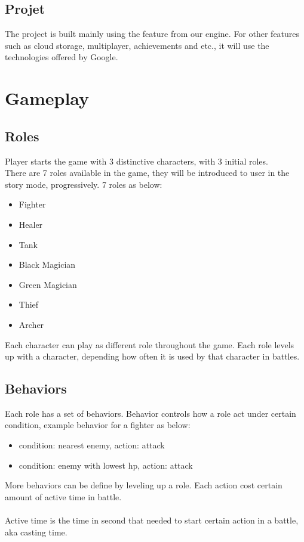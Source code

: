 \documentclass[16pt, oneside]{report}
\begin{document}
\section{Projet}
The project is built mainly using the feature from our engine. For other features such as cloud storage, multiplayer, achievements and etc., it will use the technologies offered by Google.

\chapter{Gameplay}
\section{Roles}
Player starts the game with 3 distinctive characters, with 3 initial roles. \\
There are 7 roles available in the game, they will be introduced to user in the story mode, progressively. 7 roles as below:
\begin{itemize}
	\item Fighter
	\item Healer
	\item Tank
	\item Black Magician
	\item Green Magician
	\item Thief
	\item Archer\\
\end{itemize}
Each character can play as different role throughout the game. Each role levels up with a character, depending how often it is used by that character in battles.

\section{Behaviors}
Each role has a set of behaviors. Behavior controls how a role act under certain condition, example behavior for a fighter as below:\\
\begin{itemize}
	\item condition: nearest enemy, action: attack
	\item condition: enemy with lowest hp, action: attack\\
\end{itemize}
More behaviors can be define by leveling up a role. Each action cost certain amount of active time in battle.\\\\
Active time is the time in second that needed to start certain action in a battle, aka casting time.
\end{document}
